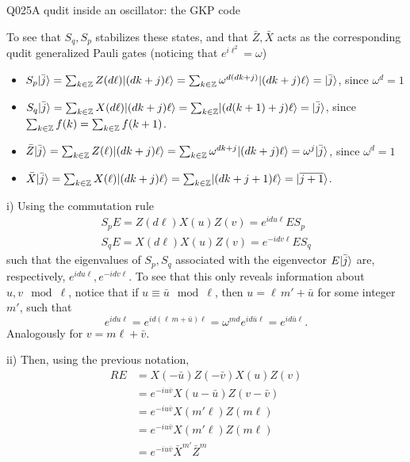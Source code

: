\begin{entry}{Q025}{A qudit inside an oscillator: the GKP code}
\begin{solution}[Part (a)]
To see that $S_q,S_p$ stabilizes these states, and that $\bar Z, \bar X$ acts as the corresponding qudit generalized Pauli gates (noticing that $e^{i\ell^2}=\omega$)

\begin{itemize}
    \item  $S_p\lvert \bar j \rangle =  \sum_{k\in\mathbb{Z}} Z(d\ell)\lvert (dk+j)\ell \rangle = \sum_{k\in\mathbb{Z}} \omega^{d(dk+j)}\lvert (dk+j)\ell \rangle = \lvert \bar {j} \rangle $, since $\omega^d=1$
\item $S_q\lvert \bar j \rangle =  \sum_{k\in\mathbb{Z}} X(d\ell)\lvert (dk+j)\ell \rangle = \sum_{k\in\mathbb{Z}} \lvert (d(k+1)+j)\ell \rangle = \lvert \bar {j} \rangle $, since $\sum_{k\in\mathbb{Z}}f(k)=\sum_{k\in\mathbb{Z}}f(k+1)$.
\item $\bar Z\lvert \bar j \rangle =  \sum_{k\in\mathbb{Z}} Z(\ell)\lvert (dk+j)\ell \rangle = \sum_{k\in\mathbb{Z}} \omega^{dk+j}\lvert (dk+j)\ell \rangle = \omega^{j}\lvert \bar {j} \rangle $, since $\omega^d=1$
\item $\bar X\lvert \bar j \rangle =  \sum_{k\in\mathbb{Z}} X(\ell)\lvert (dk+j)\ell \rangle = \sum_{k\in\mathbb{Z}} \lvert (dk+j+1)\ell \rangle = \lvert \overline{j+1} \rangle $.
\end{itemize}

\end{solution}

\begin{solution}[Part (b)]
i) Using the commutation rule
\begin{equation}
\begin{split}
     S_pE= Z(d\ell)X(u)Z(v)= e^{idu\ell}ES_p \\
     S_qE= X(d\ell)X(u)Z(v)= e^{-idv\ell}ES_q
\end{split}
\end{equation}
such that the eigenvalues of $S_p,S_q$ associated with the eigenvector $E\lvert \bar j \rangle$ are, respectively, $e^{idu\ell},e^{-idv\ell}$. To see that this only reveals information about $u,v \mod \ell$, notice that if $u \equiv \bar u \mod \ell$, then $u = \ell \, m' +\bar u $ for some integer $m'$, such that 
$$e^{idu\ell}=e^{id (\ell \, m + \bar u )\ell}= \omega^{md} e^{id \bar u\ell}= e^{id \bar u\ell}.$$
Analogously for $v = m\ell + \bar v$.

ii) Then, using the previous notation,
\begin{equation}
\begin{split}
     RE &= X(-\bar u)Z(-\bar v) X(u)Z(v)\\
     &= e^{-iu\bar v} X(u-\bar u) Z(v-\bar v)\\
     &= e^{-iu\bar v} X(m'\ell) Z(m\ell) \\
     &= e^{-iu\bar v} X(m'\ell) Z(m\ell)\\
     &= e^{-iu\bar v} \bar X^{m'} \bar Z^m
\end{split}
\end{equation}


\end{solution}
\end{entry}
